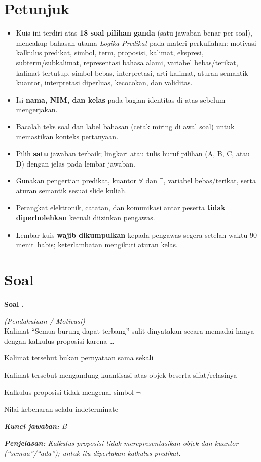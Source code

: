 \documentclass[12pt,a4paper]{article}
\newcommand{\WaktuKuis}{90 menit}
\newcommand{\kuncijawaban}[2]{%
  \par\vspace{0.25em}%
  {\small
  \textit{\textbf{Kunci jawaban:} #1}\par
  \textit{\textbf{Penjelasan:} #2}%
  \par\vspace{0.55em}}%
}
\newcounter{soalkuis}
\newcommand{\soalkuis}{%
  \refstepcounter{soalkuis}%
  \par\vspace{0.6ex plus 0.15ex}%
  \noindent\textbf{Soal \thesoalkuis.}\quad
}
\begin{document}
\section*{Petunjuk}
\begin{itemize}[leftmargin=*, itemsep=0.25em]
  \item Kuis ini terdiri atas \textbf{18 soal pilihan ganda} (satu jawaban benar per soal), mencakup bahasan utama \textit{Logika Predikat} pada materi perkuliahan: motivasi kalkulus predikat, simbol, term, proposisi, kalimat, ekspresi, subterm/subkalimat, representasi bahasa alami, variabel bebas/terikat, kalimat tertutup, simbol bebas, interpretasi, arti kalimat, aturan semantik kuantor, interpretasi diperluas, kecocokan, dan validitas.
  \item Isi \textbf{nama, NIM, dan kelas} pada bagian identitas di atas sebelum mengerjakan.
  \item Bacalah teks soal dan label bahasan (cetak miring di awal soal) untuk memastikan konteks pertanyaan.
  \item Pilih \textbf{satu} jawaban terbaik; lingkari atau tulis huruf pilihan (A, B, C, atau D) dengan jelas pada lembar jawaban.
  \item Gunakan pengertian predikat, kuantor \(\forall\) dan \(\exists\), variabel bebas/terikat, serta aturan semantik sesuai slide kuliah.
  \item Perangkat elektronik, catatan, dan komunikasi antar peserta \textbf{tidak diperbolehkan} kecuali diizinkan pengawas.
  \item Lembar kuis \textbf{wajib dikumpulkan} kepada pengawas segera setelah waktu \WaktuKuis\ habis; keterlambatan mengikuti aturan kelas.
\end{itemize}

\section*{Soal}

\soalkuis
\textit{(Pendahuluan / Motivasi)}\\
Kalimat ``Semua burung dapat terbang'' sulit dinyatakan secara memadai hanya dengan kalkulus proposisi karena \ldots
\begin{pilihan}
  \item Kalimat tersebut bukan pernyataan sama sekali
  \item Kalimat tersebut mengandung kuantisasi atas objek beserta sifat/relasinya
  \item Kalkulus proposisi tidak mengenal simbol \(\neg\)
  \item Nilai kebenaran selalu indeterminate
\end{pilihan}
\kuncijawaban{B}{Kalkulus proposisi tidak merepresentasikan objek dan kuantor (``semua''/``ada''); untuk itu diperlukan kalkulus predikat.}
\end{document}
